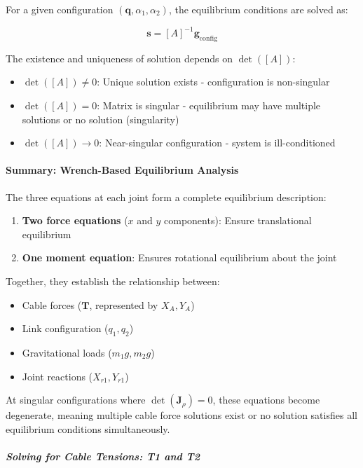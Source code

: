 For a given configuration $(\mathbf{q}, \alpha_1, \alpha_2)$, the equilibrium conditions are solved as:

\begin{equation}
\mathbf{s} = [A]^{-1} \mathbf{g}_{\text{config}}
\end{equation}

The existence and uniqueness of solution depends on $\det([A])$:

\begin{itemize}
    \item $\det([A]) \neq 0$: Unique solution exists - configuration is non-singular
    \item $\det([A]) = 0$: Matrix is singular - equilibrium may have multiple solutions or no solution (singularity)
    \item $\det([A]) \to 0$: Near-singular configuration - system is ill-conditioned
\end{itemize}

\paragraph{Summary: Wrench-Based Equilibrium Analysis}

The three equations at each joint form a complete equilibrium description:
\begin{enumerate}
    \item \textbf{Two force equations} ($x$ and $y$ components): Ensure translational equilibrium
    \item \textbf{One moment equation}: Ensures rotational equilibrium about the joint
\end{enumerate}

Together, they establish the relationship between:
\begin{itemize}
    \item Cable forces ($\mathbf{T}$, represented by $X_A, Y_A$)
    \item Link configuration ($q_1, q_2$)
    \item Gravitational loads ($m_1 g, m_2 g$)
    \item Joint reactions ($X_{r1}, Y_{r1}$)
\end{itemize}

At singular configurations where $\det(\mathbf{J}_{\rho}) = 0$, these equations become degenerate, meaning multiple cable force solutions exist or no solution satisfies all equilibrium conditions simultaneously.

\subparagraph{Solving for Cable Tensions: T1 and T2}

